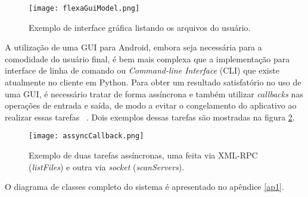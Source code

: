         \begin{figure}[!ht]
        \centering
        \texttt{[image: flexaGuiModel.png]}
        \caption{Exemplo de interface gráfica listando os arquivos do usuário.}
        \label{fig:flexaGuiModel}
        \end{figure}
        
        A utilização de uma GUI para Android, embora seja necessária para a comodidade do usuário final, é bem mais complexa que a implementação para interface de linha de comando ou \textit{Command-line Interface} (CLI) que existe atualmente no cliente em Python. Para obter um resultado satisfatório no uso de uma GUI, é necessário tratar de forma assíncrona e também utilizar \textit{callbacks} nas operações de entrada e saída, de modo a evitar o congelamento do aplicativo ao realizar essas tarefas ~\cite{androidAssyncTask}. Dois exemplos dessas tarefas são mostradas na figura \ref{fig:assyncCallback}.
        
        \begin{figure}[!ht]
        \centering
        \texttt{[image: assyncCallback.png]}
        \caption{Exemplo de duas tarefas assíncronas, uma feita via XML-RPC (\textit{listFiles}) e outra via \textit{socket} (\textit{scanServers}).}
        \label{fig:assyncCallback}
        \end{figure}
        
        O diagrama de classes completo do sistema é apresentado no apêndice \ref{ap1}.
        
    